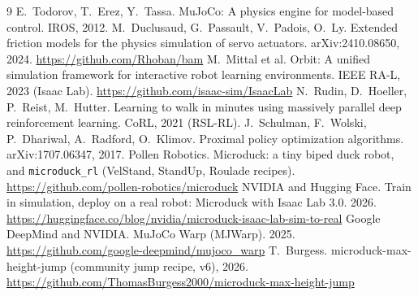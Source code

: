 \documentclass[11pt]{article}
\newcommand{\code}[1]{\texttt{\small #1}}
\begin{document}
\begin{thebibliography}{9}
 E.~Todorov, T.~Erez, Y.~Tassa. MuJoCo: A physics engine for model-based control. IROS, 2012.
 M.~Duclusaud, G.~Passault, V.~Padois, O.~Ly. Extended friction models for the physics simulation of
  servo actuators. arXiv:2410.08650, 2024. \url{https://github.com/Rhoban/bam}
 M.~Mittal et al. Orbit: A unified simulation framework for interactive robot learning
  environments. IEEE RA-L, 2023 (Isaac Lab). \url{https://github.com/isaac-sim/IsaacLab}
 N.~Rudin, D.~Hoeller, P.~Reist, M.~Hutter. Learning to walk in minutes using massively parallel deep
  reinforcement learning. CoRL, 2021 (RSL-RL).
 J.~Schulman, F.~Wolski, P.~Dhariwal, A.~Radford, O.~Klimov. Proximal policy optimization algorithms.
  arXiv:1707.06347, 2017.
 Pollen Robotics. Microduck: a tiny biped duck robot, and \code{microduck\_rl} (VelStand,
  StandUp, Roulade recipes). \url{https://github.com/pollen-robotics/microduck}
 NVIDIA and Hugging Face. Train in simulation, deploy on a real robot: Microduck with Isaac Lab
  3.0. 2026. \url{https://huggingface.co/blog/nvidia/microduck-isaac-lab-sim-to-real}
 Google DeepMind and NVIDIA. MuJoCo Warp (MJWarp). 2025. \url{https://github.com/google-deepmind/mujoco_warp}
 T.~Burgess. microduck-max-height-jump (community jump recipe, v6), 2026.
  \url{https://github.com/ThomasBurgess2000/microduck-max-height-jump}
\end{thebibliography}
\end{document}
